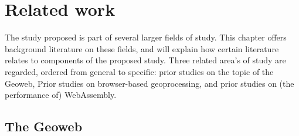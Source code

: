 
\newpage

\section{Related work}


The study proposed is part of several larger fields of study. This chapter offers background literature on these fields, and will explain how certain literature relates to components of the proposed study. 
Three related area's of study are regarded, ordered from general to specific: prior studies on the topic of the Geoweb, Prior studies on browser-based geoprocessing, and prior studies on (the performance of) WebAssembly.

\subsection{The Geoweb}
\label{sec:geoweb}

%



